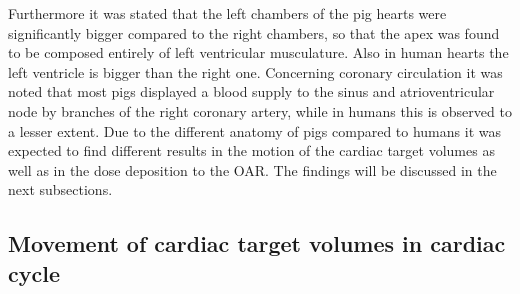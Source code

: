 Furthermore it was stated that the left chambers of the pig hearts were significantly bigger compared to the right chambers, so that the 
apex was found to be composed entirely of left ventricular musculature. Also in human hearts the left ventricle is bigger than the right one. 
Concerning coronary circulation it was noted that most pigs displayed a blood supply to the sinus and atrioventricular node by branches 
of the right coronary artery, while in humans this is observed to a lesser extent.\newline
\newline
Due to the different anatomy of pigs compared to humans it was expected to find different results in the motion of the cardiac target volumes 
as well as in the dose deposition to the OAR. The findings will be discussed in the next subsections. 

\subsection{Movement of cardiac target volumes in cardiac cycle}

